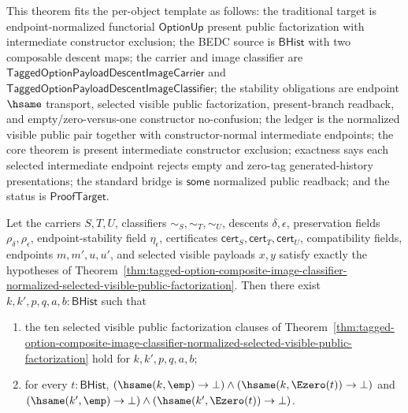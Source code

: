 \begin{theorem}
\label{thm:tagged-option-composite-image-classifier-normalized-present-intermediate-constructor-exclusion}
This theorem fits the per-object template as follows: the traditional target is endpoint-normalized functorial $\mathsf{OptionUp}$ present public factorization with intermediate constructor exclusion; the BEDC source is $\mathsf{BHist}$ with two composable descent maps; the carrier and image classifier are $\mathsf{TaggedOptionPayloadDescentImageCarrier}$ and $\mathsf{TaggedOptionPayloadDescentImageClassifier}$; the stability obligations are endpoint $\hsame$ transport, selected visible public factorization, present-branch readback, and empty/zero-versus-one constructor no-confusion; the ledger is the normalized visible public pair together with constructor-normal intermediate endpoints; the core theorem is present intermediate constructor exclusion; exactness says each selected intermediate endpoint rejects empty and zero-tag generated-history presentations; the standard bridge is $\mathsf{some}$ normalized public readback; and the status is $\mathsf{ProofTarget}$.

Let the carriers $S,T,U$, classifiers $\sim_S,\sim_T,\sim_U$, descents $\delta,\epsilon$, preservation fields $\rho_{\delta},\rho_{\epsilon}$, endpoint-stability field $\eta_{\epsilon}$, certificates $\mathsf{cert}_S,\mathsf{cert}_T,\mathsf{cert}_U$, compatibility fields, endpoints $m,m',u,u'$, and selected visible payloads $x,y$ satisfy exactly the hypotheses of Theorem~\ref{thm:tagged-option-composite-image-classifier-normalized-selected-visible-public-factorization}. Then there exist $k,k',p,q,a,b:\mathsf{BHist}$ such that
\begin{enumerate}
\item the ten selected visible public factorization clauses of Theorem~\ref{thm:tagged-option-composite-image-classifier-normalized-selected-visible-public-factorization} hold for $k,k',p,q,a,b$;
\item for every $t:\mathsf{BHist}$, $(\hsame(k,\emp)\to\bot)\land(\hsame(k,\Ezero(t))\to\bot)$ and $(\hsame(k',\emp)\to\bot)\land(\hsame(k',\Ezero(t))\to\bot)$.
\end{enumerate}
\end{theorem}
